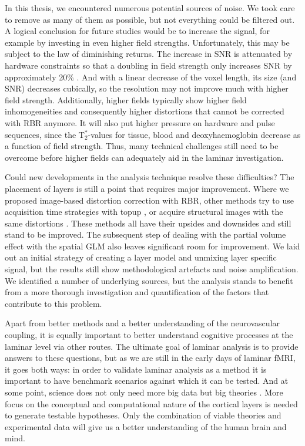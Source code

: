 In this thesis, we encountered numerous potential sources of noise. We took care to remove as many of them as possible, but not everything could be filtered out. A logical conclusion for future studies would be to increase the signal, for example by investing in even higher field strengths. Unfortunately, this may be subject to the law of diminishing returns. The increase in SNR is attenuated by hardware constraints so that a doubling in field strength only increases SNR by approximately 20\% \cite{to_be_inserted}. And with a linear decrease of the voxel length, its size (and SNR) decreases cubically, so the resolution may not improve much with higher field strength. Additionally, higher fields typically show higher field inhomogeneities and consequently higher distortions that cannot be corrected with RBR anymore. It will also put higher pressure on hardware and pulse sequences, since the T$_2^*$-values for tissue, blood and deoxyhaemoglobin decrease as a function of field strength. Thus, many technical challenges still need to be overcome before higher fields can adequately aid in the laminar investigation.

Could new developments in the analysis technique resolve these difficulties? The placement of layers is still a point that requires major improvement. Where we proposed image-based distortion correction with RBR, other methods try to use acquisition time strategies with topup \cite{Smith2004}, or acquire structural images with the same distortions \cite{Kashyap2017}. These methods all have their upsides and downsides and still stand to be improved. The subsequent step of dealing with the partial volume effect with the spatial GLM also leaves significant room for improvement. We laid out an initial strategy of creating a layer model and unmixing layer specific signal, but the results still show methodological artefacts and noise amplification. We identified a number of underlying sources, but the analysis stands to benefit from a more thorough investigation and quantification of the factors that contribute to this problem. 

Apart from better methods and a better understanding of the neurovascular coupling, it is equally important to better understand cognitive processes at the laminar level via other routes. The ultimate goal of laminar analysis is to provide answers to these questions, but as we are still in the early days of laminar fMRI, it goes both ways: in order to validate laminar analysis as a method it is important to have benchmark scenarios against which it can be tested. And at some point, science does not only need more big data but big theories \cite{Jensen2014}. More focus on the conceptual and computational nature of the cortical layers is needed to generate testable hypotheses. Only the combination of viable theories and experimental data will give us a better understanding of the human brain and mind. 




